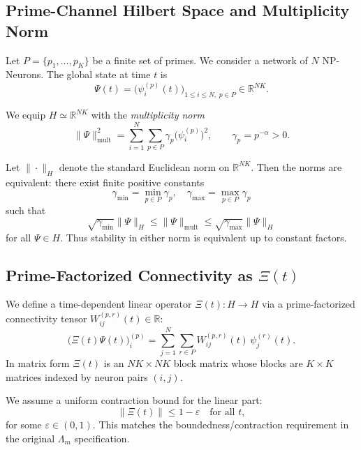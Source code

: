 \documentclass[11pt]{article}
\begin{document}
\subsection{Prime-Channel Hilbert Space and Multiplicity Norm}

Let \(P = \{p_1,\dots,p_K\}\) be a finite set of primes. We consider a network of \(N\) NP-Neurons.
The global state at time \(t\) is
\[
\Psi(t) = \bigl(\psi_i^{(p)}(t)\bigr)_{1\le i\le N,\; p\in P} \in \mathbb{R}^{NK}.
\]

We equip \(H \simeq \mathbb{R}^{NK}\) with the \emph{multiplicity norm}
\begin{equation}
\label{eq:multiplicity-norm}
\|\Psi\|_{\mathrm{mult}}^2
= \sum_{i=1}^N \sum_{p\in P} \gamma_p \bigl(\psi_i^{(p)}\bigr)^2,
\qquad
\gamma_p = p^{-\alpha} > 0.
\end{equation}

Let \(\|\cdot\|_H\) denote the standard Euclidean norm on \(\mathbb{R}^{NK}\).
Then the norms are equivalent: there exist finite positive constants
\[
\gamma_{\min} = \min_{p\in P}\gamma_p, \quad \gamma_{\max} = \max_{p\in P}\gamma_p
\]
such that
\begin{equation}
\label{eq:norm-equivalence}
\sqrt{\gamma_{\min}}\|\Psi\|_H
\le \|\Psi\|_{\mathrm{mult}}
\le \sqrt{\gamma_{\max}}\|\Psi\|_H
\end{equation}
for all \(\Psi\in H\).
Thus stability in either norm is equivalent up to constant factors.

\subsection{Prime-Factorized Connectivity as \(\Xi(t)\)}

We define a time-dependent linear operator \(\Xi(t):H\to H\) via a prime-factorized connectivity tensor \(W_{ij}^{(p,r)}(t) \in \mathbb{R}\):
\begin{equation}
\label{eq:Xi-action}
\bigl(\Xi(t)\Psi(t)\bigr)_i^{(p)}
= \sum_{j=1}^N \sum_{r\in P} W_{ij}^{(p,r)}(t)\,\psi_j^{(r)}(t).
\end{equation}
In matrix form \(\Xi(t)\) is an \(NK\times NK\) block matrix whose blocks are \(K\times K\) matrices indexed by neuron pairs \((i,j)\).

We assume a uniform contraction bound for the linear part:
\begin{equation}
\label{eq:Xi-contraction}
\|\Xi(t)\| \le 1 - \varepsilon \quad \text{for all } t,
\end{equation}
for some \(\varepsilon\in(0,1)\).
This matches the boundedness/contraction requirement in the original \(\Lambda_m\) specification.
\end{document}
